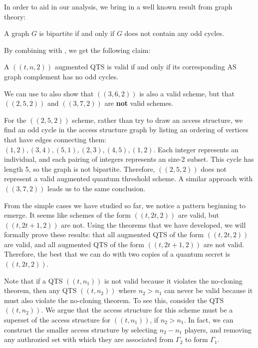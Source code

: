 In order to aid in our analysis, we bring in a well known result from graph theory:

\begin{theorem}
	\label{thm:bipartite}
	A graph $G$ is bipartite if and only if $G$ does not contain any odd cycles.
\end{theorem}

By combining  with , we get the following claim:

\begin{theorem}
    \label{thm:oddcycle-valid}
    A $((t,n,2))$ augmented QTS is valid if and only if its corresponding AS graph complement has no odd cycles.
\end{theorem}

We can use  to also show that $((3,6,2))$ is also a valid scheme, but that $((2,5,2))$ and $((3,7,2))$ are \textbf{not} valid schemes.

For the $((2,5,2))$ scheme, rather than try to draw an access structure, we find an odd cycle in the access structure graph by listing an ordering of vertices that have edges connecting them: $(1,2), (3,4), (5,1), (2,3), (4,5), (1,2)$. Each integer represents an individual, and each pairing of integers represents an size-2 subset. This cycle has length 5, so the graph is not bipartite. Therefore, $((2,5,2))$ does not represent a valid augmented quantum threshold scheme. A similar approach with $((3,7,2))$ leads us to the same conclusion.

From the simple cases we have studied so far, we notice a pattern beginning to emerge. It seems like schemes of the form $((t,2t,2))$ are valid, but $((t,2t+1,2))$ are not. Using the theorems that we have developed, we will formally prove these results: that all augmented QTS of the form $((t,2t,2))$ are valid, and all augmented QTS of the form $((t, 2t+1, 2))$ are not valid. Therefore, the best that we can do with two copies of a quantum secret is $((t,2t,2))$. 

\begin{remark}
    Note that if a QTS $((t,n_1))$ is not valid because it violates the no-cloning theorem, then any QTS $((t,n_2))$ where $n_2 > n_1$ can never be valid because it must also violate the no-cloning theorem. To see this, consider the QTS $((t,n_2))$. We argue that the access structure for this scheme must be a superset of the access structure for $((t,n_1))$, if $n_2 > n_1$. In fact, we can construct the smaller access structure by selecting $n_2-n_1$ players, and removing any authrozied set with which they are associated from $\Gamma_2$ to form $\Gamma_1$.
\end{remark}

